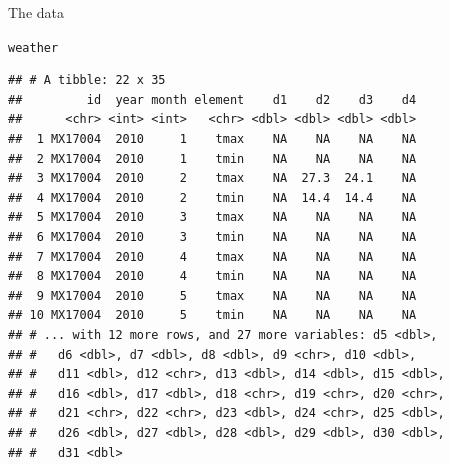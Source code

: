 \documentclass[unknownkeysallowed]{beamer}\usepackage[]{graphicx}\usepackage[]{color}
\makeatletter
\newcommand{\hlstd}[1]{\textcolor[rgb]{0.345,0.345,0.345}{#1}}%
\newenvironment{kframe}{%
 \def\at@end@of@kframe{}%
 \ifinner\ifhmode%
  \def\at@end@of@kframe{\end{minipage}}%
  \begin{minipage}{\columnwidth}%
 \fi\fi%
 \def\FrameCommand##1{\hskip\@totalleftmargin \hskip-\fboxsep
 \colorbox{shadecolor}{##1}\hskip-\fboxsep
     \hskip-\linewidth \hskip-\@totalleftmargin \hskip\columnwidth}%
 \MakeFramed {\advance\hsize-\width
   \@totalleftmargin\z@ \linewidth\hsize
   \@setminipage}}%
 {\par\unskip\endMakeFramed%
 \at@end@of@kframe}
\newenvironment{knitrout}{}{} %
\makeatother
\begin{document}
\begin{frame}[fragile]{The data}
  
\begin{knitrout}\footnotesize
{}\color{fgcolor}\begin{kframe}
\begin{alltt}
\hlstd{weather}
\end{alltt}
\begin{verbatim}
## # A tibble: 22 x 35
##         id  year month element    d1    d2    d3    d4
##      <chr> <int> <int>   <chr> <dbl> <dbl> <dbl> <dbl>
##  1 MX17004  2010     1    tmax    NA    NA    NA    NA
##  2 MX17004  2010     1    tmin    NA    NA    NA    NA
##  3 MX17004  2010     2    tmax    NA  27.3  24.1    NA
##  4 MX17004  2010     2    tmin    NA  14.4  14.4    NA
##  5 MX17004  2010     3    tmax    NA    NA    NA    NA
##  6 MX17004  2010     3    tmin    NA    NA    NA    NA
##  7 MX17004  2010     4    tmax    NA    NA    NA    NA
##  8 MX17004  2010     4    tmin    NA    NA    NA    NA
##  9 MX17004  2010     5    tmax    NA    NA    NA    NA
## 10 MX17004  2010     5    tmin    NA    NA    NA    NA
## # ... with 12 more rows, and 27 more variables: d5 <dbl>,
## #   d6 <dbl>, d7 <dbl>, d8 <dbl>, d9 <chr>, d10 <dbl>,
## #   d11 <dbl>, d12 <chr>, d13 <dbl>, d14 <dbl>, d15 <dbl>,
## #   d16 <dbl>, d17 <dbl>, d18 <chr>, d19 <chr>, d20 <chr>,
## #   d21 <chr>, d22 <chr>, d23 <dbl>, d24 <chr>, d25 <dbl>,
## #   d26 <dbl>, d27 <dbl>, d28 <dbl>, d29 <dbl>, d30 <dbl>,
## #   d31 <dbl>
\end{verbatim}
\end{kframe}
\end{knitrout}
  
\end{frame}
\end{document}
